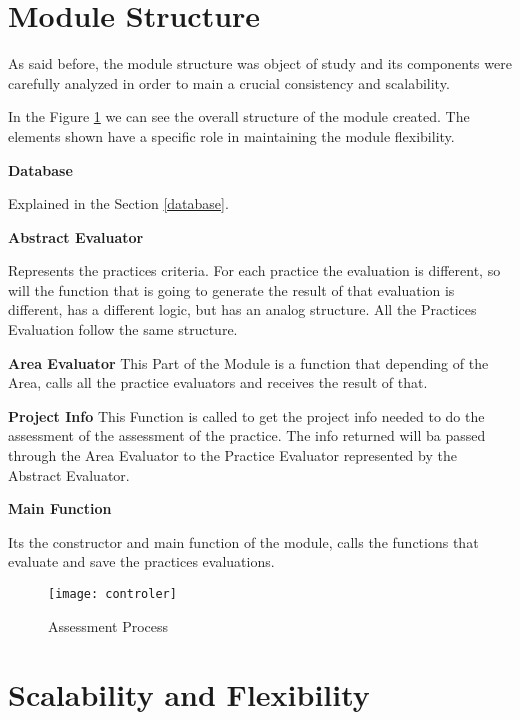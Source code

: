 \section{Module Structure}

As said before, the module structure was object of study and its components were carefully analyzed in order to main a crucial consistency and scalability.

In the Figure \ref{fig:esquema} we can see the overall structure of the module created. The elements shown have a specific role in maintaining the module flexibility. 

\textbf{Database}

Explained in the Section \ref{database}.

\textbf{Abstract Evaluator}

Represents the practices criteria. For each practice the evaluation is different, so will the function that is going to generate the result of that evaluation is different, has a different logic, but has an analog structure. All the Practices Evaluation follow the same structure.

\textbf{Area Evaluator}
This Part of the Module is a function that depending of the Area, calls all the practice evaluators and receives the result of that.


\textbf{Project Info}
This Function is called to get the project info needed to do the assessment of the assessment of the practice. The info returned will ba passed through the Area Evaluator to the Practice Evaluator represented by the Abstract Evaluator.

\textbf{Main Function}

Its the constructor and main function of the module, calls the functions that evaluate and save the practices evaluations.

\begin{landscape}
\begin{figure}[f]
	\begin{center}
		\leavevmode
		\texttt{[image: controler]}
		\caption{Assessment Process}
		\label{fig:esquema}
	\end{center}
\end{figure}
\end{landscape}

\section{Scalability and Flexibility}

